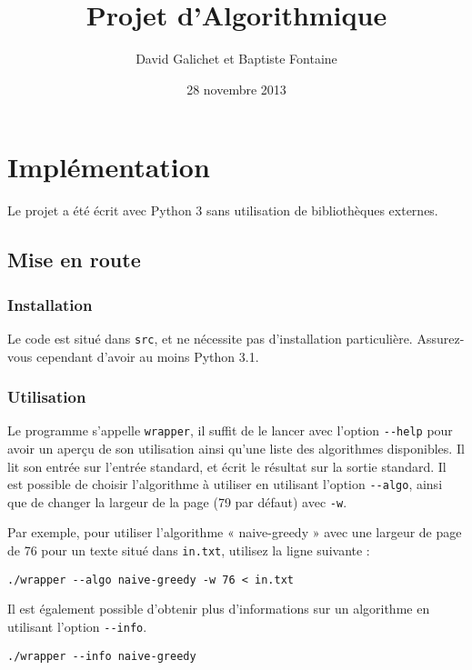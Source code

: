 \documentclass{article}
\begin{document}
\title{Projet d'Algorithmique}
\author{David Galichet et Baptiste Fontaine}
\date{28 novembre 2013}
\maketitle

\chapter{Implémentation}

Le projet a été écrit avec Python 3 sans utilisation de bibliothèques externes.

\section{Mise en route}
\subsection{Installation}

Le code est situé dans \verb|src|, et ne nécessite pas d'installation
particulière. Assurez-vous cependant d'avoir au moins Python 3.1.

\subsection{Utilisation}

Le programme s'appelle \verb|wrapper|, il suffit de le lancer avec l'option
\verb|--help| pour avoir un aperçu de son utilisation ainsi qu'une liste des
algorithmes disponibles. Il lit son entrée sur l'entrée standard, et écrit le
résultat sur la sortie standard. Il est possible de choisir l'algorithme à
utiliser en utilisant l'option \verb|--algo|, ainsi que de changer la largeur
de la page (79 par défaut) avec \verb|-w|.

Par exemple, pour utiliser l'algorithme « naive-greedy » avec une largeur de
page de 76 pour un texte situé dans \verb|in.txt|, utilisez la ligne suivante :

\begin{verbatim}
./wrapper --algo naive-greedy -w 76 < in.txt
\end{verbatim}

Il est également possible d'obtenir plus d'informations sur un algorithme en
utilisant l'option \verb|--info|.

\begin{verbatim}
./wrapper --info naive-greedy
\end{verbatim}
\end{document}
